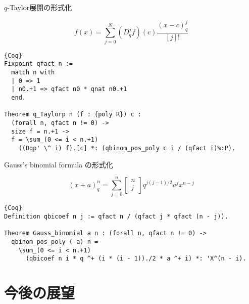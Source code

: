 \documentclass[dvipdfmx,cjk]{beamer}
\theoremstyle{mystyle}
\newcommand{\qcoe}[2]{\left[\begin{array}{ccc}#1\\#2\end{array}\right]}
\newcommand{\0}{\textbf{0}}
\begin{document}
\begin{frame}[fragile]{$q$-Taylor展開の形式化}
	\begin{screen}
		\[
			f(x) = \sum_{j=0}^N (D_q^jf)(c)\frac{(x-c)^j_q}{[j]!}
		\]
	\end{screen} \pause
	\begin{lstlisting}{Coq}
Fixpoint qfact n :=
  match n with
  | 0 => 1
  | n0.+1 => qfact n0 * qnat n0.+1
  end.

Theorem q_Taylorp n (f : {poly R}) c :
  (forall n, qfact n != 0) ->
  size f = n.+1 ->
  f = \sum_(0 <= i < n.+1)
    ((Dqp' \^ i) f).[c] *: (qbinom_pos_poly c i / (qfact i)%:P).
\end{lstlisting}
\end{frame}

\begin{frame}[fragile]{Gauss's binomial formula の形式化}
	\begin{screen}
		\[
			(x + a)^n_q = \sum_{j = 0}^n \qcoe{n}{j} q^{j (j - 1)/2} a^j x^{n - j}
		\]
	\end{screen} \pause
	\begin{lstlisting}{Coq}
Definition qbicoef n j := qfact n / (qfact j * qfact (n - j)).

Theorem Gauss_binomial a n : (forall n, qfact n != 0) ->
  qbinom_pos_poly (-a) n =
    \sum_(0 <= i < n.+1)
      (qbicoef n i * q ^+ (i * (i - 1))./2 * a ^+ i) *: 'X^(n - i). \end{lstlisting}
\end{frame}
\section{今後の展望}

\begin{frame}
	\tableofcontents[currentsection] 
\end{frame}
\end{document}
